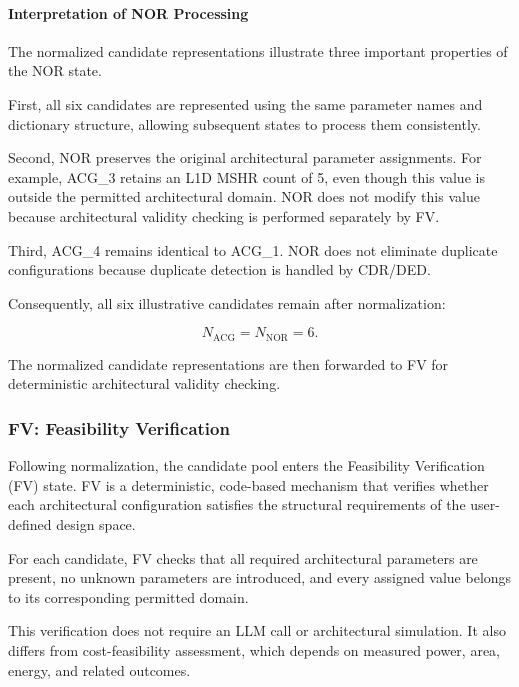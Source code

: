 \paragraph{Interpretation of NOR Processing}

The normalized candidate representations
illustrate three important properties
of the NOR state.

First, all six candidates are represented
using the same parameter names and dictionary
structure, allowing subsequent states to
process them consistently.

Second, NOR preserves the original
architectural parameter assignments.
For example, ACG\_3 retains an L1D MSHR
count of 5, even though this value is
outside the permitted architectural domain.
NOR does not modify this value because
architectural validity checking is performed
separately by FV.

Third, ACG\_4 remains identical to ACG\_1.
NOR does not eliminate duplicate
configurations because duplicate detection
is handled by CDR/DED.

Consequently, all six illustrative
candidates remain after normalization:

\begin{equation}
N_{\mathrm{ACG}} =
N_{\mathrm{NOR}} = 6.
\end{equation}

The normalized candidate representations
are then forwarded to FV for deterministic
architectural validity checking.


\subsubsection{FV: Feasibility Verification}
\label{app:illustrative_fv}

Following normalization, the candidate pool enters
the Feasibility Verification (FV) state. FV is a
deterministic, code-based mechanism that verifies
whether each architectural configuration satisfies
the structural requirements of the user-defined
design space.

For each candidate, FV checks that all required
architectural parameters are present, no unknown
parameters are introduced, and every assigned value
belongs to its corresponding permitted domain.

This verification does not require an LLM call or
architectural simulation. It also differs from
cost-feasibility assessment, which depends on
measured power, area, energy, and related outcomes.

